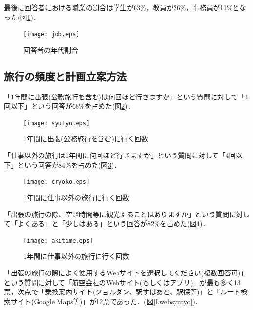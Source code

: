 \documentclass{funthesis}
\begin{document}
\clearpage

最後に回答者における職業の割合は学生が63\%，教員が26\%，事務員が11\%となった(図\ref{Ljob})．

\begin{figure}[htpb]
\begin{center}
\texttt{[image: job.eps]}
\end{center}
\caption{回答者の年代割合}
\label{Ljob}
\end{figure}

\clearpage

\subsection{旅行の頻度と計画立案方法}

「1年間に出張(公務旅行を含む)は何回ほど行きますか」という質問に対して「4回以下」という回答が68\%を占めた(図\ref{Lsyutyo})．

\begin{figure}[htpb]
\begin{center}
\texttt{[image: syutyo.eps]}
\end{center}
\caption{1年間に出張(公務旅行を含む)に行く回数}
\label{Lsyutyo}
\end{figure}

\clearpage

「仕事以外の旅行は1年間に何回ほど行きますか」という質問に対して「4回以下」という回答が84\%を占めた(図\ref{Lcryoko})．

\begin{figure}[htpb]
\begin{center}
\texttt{[image: cryoko.eps]}
\end{center}
\caption{1年間に仕事以外の旅行に行く回数}
\label{Lcryoko}
\end{figure}

\clearpage

「出張の旅行の際、空き時間等に観光することはありますか」という質問に対して「よくある」と「少しはある」という回答が82\%を占めた(図\ref{Lakitime})．

\begin{figure}[htpb]
\begin{center}
\texttt{[image: akitime.eps]}
\end{center}
\caption{1年間に仕事以外の旅行に行く回数}
\label{Lakitime}
\end{figure}

\clearpage

「出張の旅行の際によく使用するWebサイトを選択してください(複数回答可)」という質問に対して「航空会社のWebサイト(もしくはアプリ)」が最も多く13票，次点で「乗換案内サイト(ジョルダン、駅すぱあと、駅探等)」と「ルート検索サイト(Google Maps等)」が12票であった．(図\ref{Lwebsyutyo})．
\end{document}
